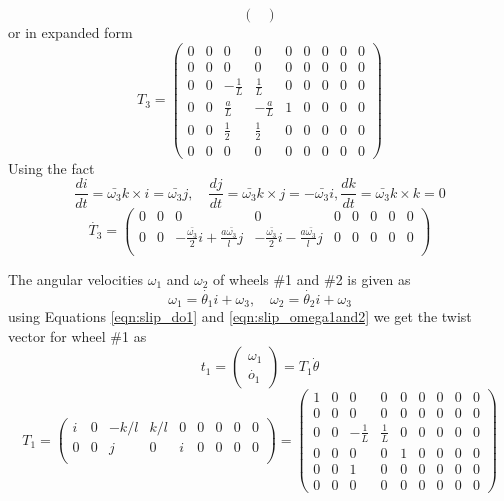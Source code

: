 {\begin{equation}
\begin{pmatrix}
\end{pmatrix}
\end{equation}
or in expanded form
\begin{equation}
\label{eqn:slip_T3}
T_3=\left(
\begin{array}{ccccccccc}
0 & 0 & 0 & 0 & 0 & 0 & 0 & 0 & 0 \\
0 & 0 & 0 & 0 & 0 & 0 & 0 & 0 & 0 \\
0 & 0 & -\frac{1}{L} & \frac{1}{L} & 0 & 0 & 0 & 0 & 0 \\
0 & 0 & \frac{a}{L} & -\frac{a}{L} & 1 & 0 & 0 & 0 & 0 \\
0 & 0 & \frac{1}{2} & \frac{1}{2} & 0 & 0 & 0 & 0 & 0 \\
0 & 0 & 0 & 0 & 0 & 0 & 0 & 0 & 0
\end{array}
\right)
\end{equation}
Using the fact \[\frac{d i}{dt}=\bar{\omega_3}k\times i =\bar{\omega_3}j, \quad  \frac{d j}{dt}=\bar{\omega_3}k\times j =-\bar{\omega_3}i, \frac{d k}{dt}=\bar{\omega_3}k\times k =0 \] 
\begin{equation}
\label{eqn:slip_dT3}
\dot{T_3}=\begin{pmatrix}
0 & 0& 0 & 0 & 0 &0 & 0 &0 &0\\
0 & 0&-\frac{ \bar{\omega_3}}{2}i +\frac{a \bar{\omega_3}}{l}j& -\frac{ \bar{\omega_3}}{2}i -\frac{a \bar{\omega_3}}{l}j & 0 &0 & 0 &0 &0\\ 
\end{pmatrix}
\end{equation}

The angular velocities $\omega_1$ and $\omega_2$ of wheels \#1 and \#2 is given as
\begin{equation}
\label{eqn:slip_omega1and2}
\omega_1=\dot{\theta_1}i+\omega_3, \quad \omega_2=\dot{\theta_2}i+\omega_3
\end{equation}
using Equations \ref{eqn:slip_do1} and \ref{eqn:slip_omega1and2}  we get the twist vector for wheel \#1 as 
\begin{equation}
\label{eqn:slip_t1}
t_1=
\begin{pmatrix}
\omega_1\\
\dot{o_1}
\end{pmatrix}=T_1 \dot{\theta}
\end{equation} 
\begin{equation}
\label{eqn:slip_T1}
T_1=
\begin{pmatrix}
i & 0& -k/l & k/l & 0 &0 & 0 &0 &0\\
0 & 0& j& 0 & i &0 & 0 &0 &0\\ 
\end{pmatrix}=
\left(
\begin{array}{ccccccccc}
1 & 0 & 0 & 0 & 0 & 0 & 0 & 0 & 0 \\
0 & 0 & 0 & 0 & 0 & 0 & 0 & 0 & 0 \\
0 & 0 & -\frac{1}{L} & \frac{1}{L} & 0 & 0 & 0 & 0 & 0 \\
0 & 0 & 0 & 0 & 1 & 0 & 0 & 0 & 0 \\
0 & 0 & 1 & 0 & 0 & 0 & 0 & 0 & 0 \\
0 & 0 & 0 & 0 & 0 & 0 & 0 & 0 & 0
\end{array}
\right)
\end{equation}

}
